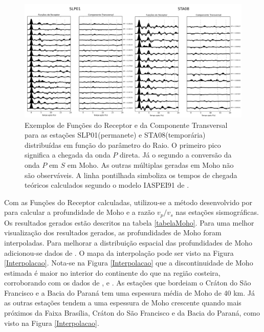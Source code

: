 \begin{figure}[!ht]
\centering
\includegraphics[scale=0.16]{Figs/RF_SLP01_STA08.png}
\caption[Exemplos de Funções do Receptor e da Componente Transversal para as estações SLP01(permanete) e STA08(temporária) distribuídas em função do parâmetro do Raio.]{Exemplos de Funções do Receptor e da Componente Transversal para as estações SLP01(permanete) e STA08(temporária) distribuídas em função do parâmetro do Raio. O primeiro pico significa a chegada da onda $P$ direta. Já o segundo a conversão da onda $P$ em $S$ em Moho. As outras múltiplas geradas em Moho não são observáveis. A linha pontilhada simboliza os tempos de chegada teóricos calculados segundo o modelo IASPEI91 de \cite{kennet_iaspei_1991}.}
\label{RF_SLP01_STA08}
\end{figure}

Com as Funções do Receptor calculadas, utilizou-se a método desenvolvido por \cite{Zhu_Kanamori_2000} para calcular a profundidade de Moho e a razão $v_{p}/v_{s}$ nas estações sismográficas. Os resultados gerados estão descritos na tabela \ref{tabelaMoho}. Para uma melhor visualização dos resultados gerados, as profundidades de Moho foram interpoladas. Para melhorar a distribuição espacial das profundidades de Moho adicionou-se dados de \cite{Assumpcao_Brazil_2013}. O mapa da interpolação pode ser visto na Figura \ref{Interpolacao}. Nota-se na Figura \ref{Interpolacao} que a discontinuidade de Moho estimada é maior no interior do continente do que na região costeira, corroborando com os dados de \cite{Assumpcao_America_2013}, \citep{Assumpcao_Brazil_2013} e \cite{van_der_meijde_gravity_2013}. As estações que bordeiam o Cráton do São Francisco e a Bacia do Paraná tem uma espessura média de Moho de 40 km. Já as outras estações tendem a uma espessura de Moho crescente quando mais próximos da Faixa Brasília, Cráton do São Francisco e da Bacia do Paraná, como visto na Figura \ref{Interpolacao}.

